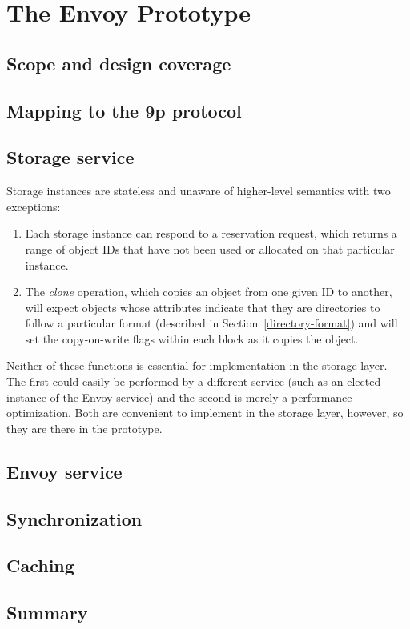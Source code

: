 \chapter{The Envoy Prototype}

\section{Scope and design coverage}
\section{Mapping to the 9p protocol}
\section{Storage service}

Storage instances are stateless and unaware of higher-level semantics with two exceptions:

\begin{enumerate}
\item Each storage instance can respond to a reservation request, which returns a range of object IDs that have not been used or allocated on that particular instance.
\item The \emph{clone} operation, which copies an object from one given ID to another, will expect objects whose attributes indicate that they are directories to follow a particular format (described in Section~\ref{directory-format}) and will set the copy-on-write flags within each block as it copies the object.
\end{enumerate}

Neither of these functions is essential for implementation in the storage layer. The first could easily be performed by a different service (such as an elected instance of the Envoy service) and the second is merely a performance optimization. Both are convenient to implement in the storage layer, however, so they are there in the prototype.

\section{Envoy service}
\section{Synchronization}
\section{Caching}

\section{Summary}